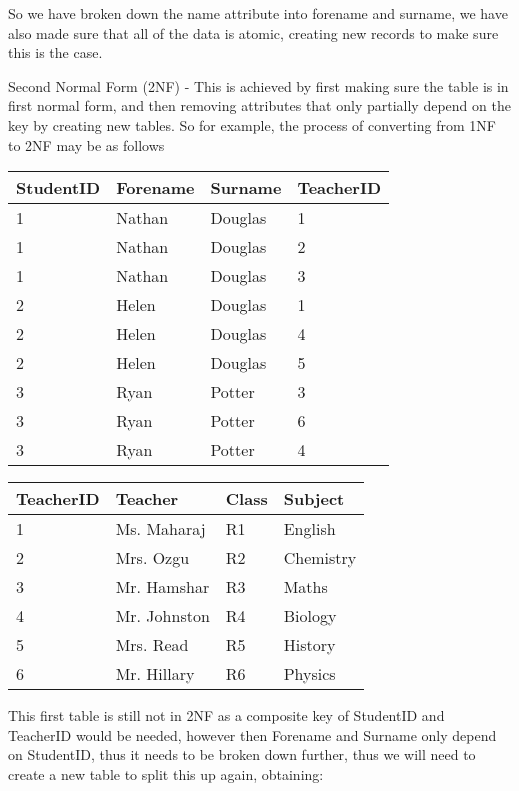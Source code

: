 So we have broken down the name attribute into forename and surname, we have also made sure that all of the data is atomic, creating new records to make sure this is the case.

Second Normal Form (2NF) - This is achieved by first making sure the table is in first normal form, and then removing attributes that only partially depend on the key by creating new tables. So for example, the process of converting from 1NF to 2NF may be as follows

\begin{table}[H]
	\begin{tabular}{| l | l | l | l |}
		\hline
		StudentID & Forename & Surname & TeacherID\\\hline
		1 & Nathan & Douglas & 1\\\hline
		1 & Nathan & Douglas & 2\\\hline
		1 & Nathan & Douglas & 3\\\hline
		2 & Helen & Douglas & 1\\\hline
		2 & Helen & Douglas & 4\\\hline
		2 & Helen & Douglas & 5\\\hline
		3 & Ryan & Potter & 3\\\hline
		3 & Ryan & Potter & 6\\\hline
		3 & Ryan & Potter & 4\\\hline
	\end{tabular}
	
	\begin{tabular}{| l | l | l | l |}
		\hline
		TeacherID & Teacher & Class & Subject \\\hline
		1 & Ms. Maharaj & R1 & English \\\hline
		2 & Mrs. Ozgu & R2 & Chemistry \\\hline
		3 & Mr. Hamshar & R3 & Maths \\\hline
		4 & Mr. Johnston & R4 & Biology \\\hline
		5 & Mrs. Read & R5 & History \\\hline
		6 & Mr. Hillary & R6 & Physics \\\hline
	\end{tabular}
\end{table}

This first table is still not in 2NF as a composite key of StudentID and TeacherID would be needed, however then Forename and Surname only depend on StudentID, thus it needs to be broken down further, thus we will need to create a new table to split this up again, obtaining:

